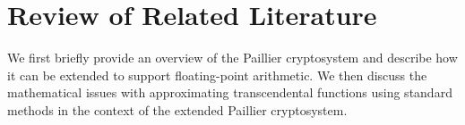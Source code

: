 \section{Review of Related Literature}

We first briefly provide an overview of the Paillier cryptosystem and describe how it can be extended to support floating-point arithmetic. We then discuss the mathematical issues with approximating transcendental functions using standard methods in the context of the extended Paillier cryptosystem.




